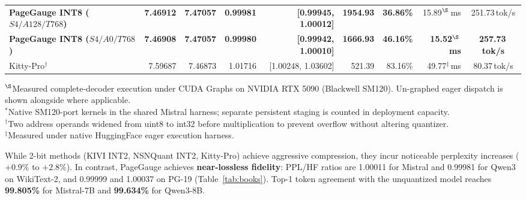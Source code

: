 \documentclass{article}
\begin{document}
\begin{table}[t]
{\begin{tabular}{lrrrrrrrc}
\textbf{PageGauge INT8 ($S4/A128/T768$)} & \textbf{7.46912} & \textbf{7.47057} & \textbf{0.99981} & \textbf{[0.99945, 1.00012]} & \textbf{1954.93} & \textbf{36.86\%} & 15.89$^\S$\,ms & 251.73\,tok/s \\
\textbf{PageGauge INT8 ($S4/A0/T768$)} & \textbf{7.46908} & \textbf{7.47057} & \textbf{0.99980} & \textbf{[0.99942, 1.00010]} & \textbf{1666.93} & \textbf{46.16\%} & \textbf{15.52$^\S$\,ms} & \textbf{257.73\,tok/s} \\
Kitty-Pro$^\dagger$ & 7.59687 & 7.46873 & 1.01716 & [1.00248, 1.03602] & 521.39 & 83.16\% & 49.77$^\ddagger$\,ms & \phantom{0}80.37\,tok/s \\
\bottomrule
\end{tabular}}
\par\smallskip\footnotesize
$^\S$Measured complete-decoder execution under CUDA Graphs on NVIDIA RTX 5090 (Blackwell SM120). Un-graphed eager dispatch is shown alongside where applicable.\\
$^*$Native SM120-port kernels in the shared Mistral harness; separate persistent staging is counted in deployment capacity.\\
$^\dagger$Two address operands widened from uint8 to int32 before multiplication to prevent overflow without altering quantizer.\\
$^\ddagger$Measured under native HuggingFace eager execution harness.
\end{table}

\begin{table}[t]
\caption{Cross-corpus evaluation on eight PG-19 books per model (12,288 recurrent decode steps; $20,480$-token prefix).}
\label{tab:books}
\centering\small
{}
\end{table}

While 2-bit methods (KIVI INT2, NSNQuant INT2, Kitty-Pro) achieve aggressive compression, they incur noticeable perplexity increases ($+0.9\%$ to $+2.8\%$). In contrast, PageGauge achieves \textbf{near-lossless fidelity}: PPL/HF ratios are 1.00011 for Mistral and 0.99981 for Qwen3 on WikiText-2, and 0.99999 and 1.00037 on PG-19 (Table~\ref{tab:books}). Top-1 token agreement with the unquantized model reaches \textbf{99.805\%} for Mistral-7B and \textbf{99.634\%} for Qwen3-8B.
\end{document}
